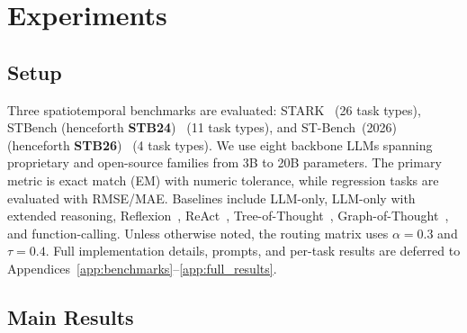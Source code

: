 \section{Experiments}
\label{sec:experiments}

\subsection{Setup}
\label{sec:setup}

Three spatiotemporal benchmarks are evaluated: STARK~\citep{quan2025benchmarking} (26 task types), STBench (henceforth \textbf{STB24})~\citep{li2025stbench} (11 task types), and ST-Bench~(2026) (henceforth \textbf{STB26})~\citep{ni2026streasoner} (4 task types). We use eight backbone LLMs spanning proprietary and open-source families from 3B to 20B parameters.
The primary metric is exact match (EM) with numeric tolerance, while regression tasks are evaluated with RMSE/MAE.
Baselines include LLM-only, LLM-only with extended reasoning, Reflexion~\citep{shinn2023reflexion}, ReAct~\citep{yao2022react}, Tree-of-Thought~\citep{yao2023tree}, Graph-of-Thought~\citep{besta2024graph, yao2024got}, and function-calling.
Unless otherwise noted, the routing matrix uses $\alpha=0.3$ and $\tau=0.4$.
Full implementation details, prompts, and per-task results are deferred to Appendices~\ref{app:benchmarks}--\ref{app:full_results}.

\subsection{Main Results}
\label{sec:results}



